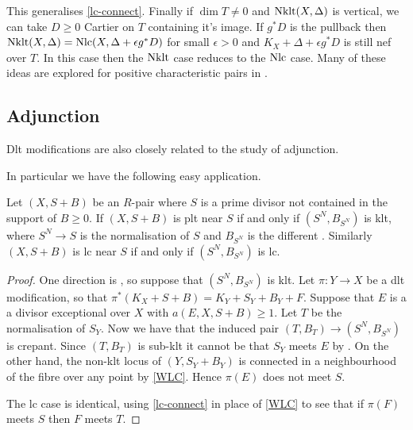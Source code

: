 This generalises \autoref{lc-connect}. Finally if $\dim T  \neq 0$ and $\textup{Nklt}(X,\Delta)$ is vertical, we can take $D \geq 0$ Cartier on $T$ containing it's image. If $g^{*}D$ is the pullback then $\textup{Nklt}(X,\Delta)=\textup{Nlc}(X,\Delta+\epsilon g^{*}D)$ for small $\epsilon >0$ and $K_{X}+\Delta+\epsilon g^{*}D$ is still nef over $T$. In this case then the $\textup{Nklt}$ case reduces to the $\textup{Nlc}$ case. Many of these ideas are explored for positive characteristic pairs in \cite{filipazzi2020connectedness}.



\subsection{Adjunction}

Dlt modifications are also closely related to the study of adjunction.

In particular we have the following easy application.

\begin{theorem}\label{t-inv_adj}
	Let $(X,S+B)$ be an $R$-pair where $S$ is a prime divisor not contained in the support of $B \geq 0$. If $(X,S+B)$ is plt near $S$ if and only if $(S^{N},B_{S^{N}})$ is klt, where $S^{N} \to S$ is the normalisation of $S$ and $B_{S^{N}}$ is the different \cite[Definition 4.2]{kk-singbook}. Similarly $(X,S+B)$ is lc near $S$ if and only if $(S^{N},B_{S^{N}})$ is lc.
\end{theorem}

\begin{proof}
	One direction is \cite[Lemma 4.8]{kk-singbook}, so suppose that $(S^{N},B_{S^{N}})$ is klt. Let $\pi:Y \to X$ be a dlt modification, so that $\pi^{*}(K_{X}+S+B)=K_{Y}+S_{Y}+B_{Y}+F$. Suppose that $E$ is a a divisor exceptional over $X$ with $a(E,X,S+B) \geq 1$. Let $T$ be the normalisation of $S_{Y}$. Now we have that the induced pair $(T,B_{T})\to (S^{N},B_{S^{N}})$ is crepant. Since $(T,B_{T})$ is sub-klt it cannot be that $S_{Y}$ meets $E$ by \cite[Claim 4.7.3]{kk-singbook}. On the other hand, the non-klt locus of $(Y,S_{Y}+B_{Y})$ is connected in a neighbourhood of the fibre over any point by \autoref{WLC}. Hence $\pi(E)$ does not meet $S$.
	
	The lc case is identical, using \autoref{lc-connect} in place of \autoref{WLC} to see that if $\pi(F)$ meets $S$ then $F$ meets $T$. 
\end{proof}

